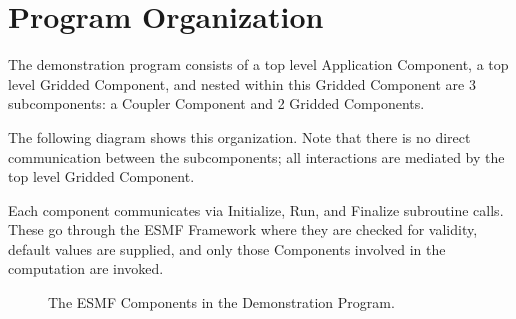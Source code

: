 
\section{Program Organization}

The demonstration program consists of a top level Application
Component, a top level Gridded Component, and nested within this Gridded
Component are 3 subcomponents: a Coupler Component and 2 Gridded Components.

The following diagram shows this organization.  Note that there
is no direct communication between the subcomponents; all
interactions are mediated by the top level Gridded Component.

Each component communicates via Initialize, Run, and Finalize
subroutine calls.  These go through the ESMF Framework where
they are checked for validity, default values are supplied,
and only those Components involved in the computation are
invoked.


\begin{figure}[bpht]
\caption[Components]{The ESMF Components in the Demonstration Program.}
\label{fig:democomps}
\begin{center}
\end{center}
\end{figure}


